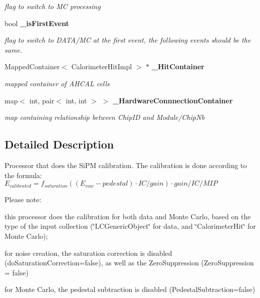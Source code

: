 \begin{DoxyCompactItemize}
\begin{DoxyCompactList}\small\item\em flag to switch to MC processing \item\end{DoxyCompactList}\item 
bool {\bf \_\-isFirstEvent}
\begin{DoxyCompactList}\small\item\em flag to switch to DATA/MC at the first event, the following events should be the same. \item\end{DoxyCompactList}\item 
MappedContainer$<$ CalorimeterHitImpl $>$ $\ast$ {\bf \_\-HitContainer}\label{classCALICE_1_1Ahc2CalibrateProcessor_ab386d03c40a8816dca77af0f9b1b7496}

\begin{DoxyCompactList}\small\item\em mapped container of AHCAL cells \item\end{DoxyCompactList}\item 
map$<$ int, pair$<$ int, int $>$ $>$ {\bf \_\-HardwareConnnectionContainer}\label{classCALICE_1_1Ahc2CalibrateProcessor_a20c1332ea5ef0de61f3ffb74e104f873}

\begin{DoxyCompactList}\small\item\em map containing relationship between ChipID and Module/ChipNb \item\end{DoxyCompactList}\end{DoxyCompactItemize}


\subsection{Detailed Description}
Processor that does the SiPM calibration. The calibration is done according to the formula: $E_{calibrated}=f_{saturation}((E_{raw}-pedestal) \cdot IC/gain) \cdot gain/IC/MIP$

Please note:
\begin{DoxyItemize}
\item this processor does the calibration for both data and Monte Carlo, based on the type of the input collection (\char`\"{}LCGenericObject\char`\"{} for data, and \char`\"{}CalorimeterHit\char`\"{} for Monte Carlo);
\item for noise creation, the saturation correction is disabled (doSaturationCorrection=false), as well as the ZeroSuppression (ZeroSuppression = false)
\item for Monte Carlo, the pedestal subtraction is disabled (PedestalSubtraction=false)
\end{DoxyItemize}

